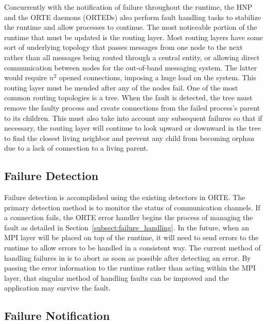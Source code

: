 Concurrently with the notification of failure throughout the runtime, the HNP
and the ORTE daemons (ORTEDs) also perform fault handling tasks to stabilize the
runtime and allow processes to continue. The most noticeable portion of the
runtime that must be updated is the routing layer. Most routing layers have some
sort of underlying topology that passes messages from one node to the next rather than all
messages being routed through a central entity, or allowing direct communication
between nodes for the out-of-band messaging system. The latter would require
$n^2$ opened connections, imposing a huge load on the system. This routing layer
must be mended after any of the nodes fail. One of the most common routing
topologies is a tree. When the fault is detected, the tree must remove the
faulty process and create connections from the failed process's parent to its
children. This must also take into account any subsequent failures so that if
necessary, the routing layer will continue to look upward or downward in the
tree to find the closest living neighbor and prevent any child from becoming
orphan due to a lack of connection to a living parent.

\subsection{Failure Detection} \label{subsect:failure_detection}

Failure detection is accomplished using the existing detectors in ORTE. The
primary detection method is to monitor the status of communication channels. If
a connection fails, the ORTE error handler begins the process of managing the
fault as detailed in Section~\ref{subsect:failure_handling}. In the future, when
an MPI layer will be placed on top of the runtime, it will need to send errors
to the runtime to allow errors to be handled in a consistent way. The current
method of handling failures in \ompi is to abort as soon as possible after
detecting an error. By passing the error information to the runtime rather than
acting within the MPI layer, that singular method of handling faults can be
improved and the application may survive the fault.

\subsection{Failure Notification} \label{subsect:failure_notification}

